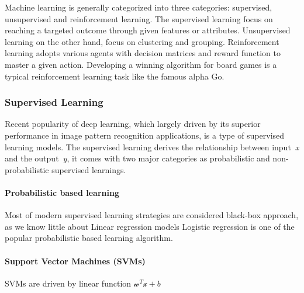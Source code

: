 Machine learning is generally categorized into three categories: supervised, unsupervised and reinforcement learning. The supervised learning focus on reaching a targeted outcome through given features or attributes. Unsupervised learning on the other hand, focus on clustering and grouping. Reinforcement learning adopts various agents with decision matrices and reward function to master a given action. Developing a winning algorithm for board games is a typical reinforcement learning task like the famous alpha Go.
\par

\subsubsection{Supervised Learning}

Recent popularity of deep learning, which largely driven by its superior performance in image pattern recognition applications, is a type of supervised learning models. The supervised learning  derives the relationship between input~\textit{x} and the output~\textit{y}, it comes with two major categories as probabilistic and non-probabilistic supervised learnings. 

\paragraph{Probabilistic based learning}
Most of modern supervised learning strategies are considered black-box approach, as we know little about 
Linear regression models 
Logistic regression is one of the popular probabilistic based learning algorithm. 

\paragraph{Support Vector Machines (SVMs)}
SVMs are driven by linear function $\mathcal{w}^T\mathcal{x}+b$ 


